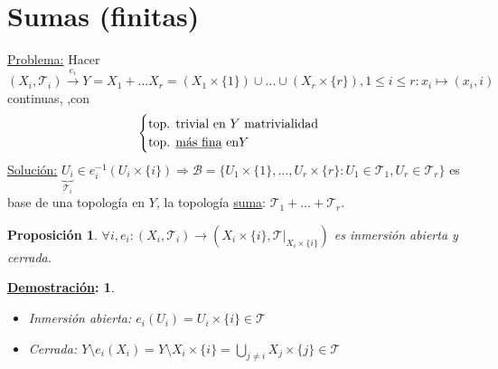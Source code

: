 \documentclass[10pt,a4paper,openright]{book}
\theoremstyle{break}
\newtheorem*{prop}{Proposición}
\newtheorem*{demo}{\underline{Demostración}:}
\begin{document}
\section{Sumas (finitas)}%
\label{sec:sumas_finitas_}
\underline{Problema:} Hacer $\left( X_i, \mathcal{T}_i \right) \xrightarrow{e_i} Y = X_1 + \ldots X_r = \left( X_1 \times \{1\} \right) \cup \ldots \cup \left( X_r \times \{r\} \right), 1 \le i \le r: x_i \mapsto \left( x_i, i \right)$ continuas, ,con 
\[
\begin{cases}
    \text{top. trivial en } Y \text{ matrivialidad}\\
    \text{top. \underline{más fina} en} Y
\end{cases} 
\]
\underline{Solución:} $\underbrace{U_i}_{\mathcal{T}_i} \in e_i^{-1}\left( U_i \times \{i\} \right) \Rightarrow \mathcal{B} = \{U_1 \times \{1\}, \ldots, U_r \times \{r\}: U_1 \in \mathcal{T}_1, U_r \in \mathcal{T}_r\}$ es base de una topología en $Y$, la topología \underline{suma}: $\mathcal{T}_1 + \ldots + \mathcal{T}_r$.

\begin{prop}
$\forall i, e_i: \left( X_i, \mathcal{T}_i \right) \rightarrow \left( X_i\times \{i\}, \mathcal{T}|_{X_i \times \{i\}} \right)$ es inmersión abierta y cerrada.
\end{prop}
\begin{demo}
\begin{itemize}
    \item Inmersión abierta: $e_i\left( U_i \right) = U_i \times \{i\} \in \mathcal{T}$
    \item Cerrada: $Y\setminus e_i\left( X_i \right) = Y \setminus X_i \times \{i\} = \bigcup_{j \neq i} X_j \times \{j\} \in \mathcal{T}$
\end{itemize}
\end{demo}
\end{document}
